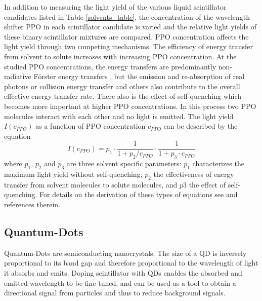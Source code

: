 \documentclass{JINST}
\begin{document}
 
In addition to measuring the light yield of the various liquid scintillator candidates listed in Table \ref{solvents_table}, the concentration of the wavelength shifter PPO in each scintillator candidate is varied and the relative light yields of these binary scintillator mixtures are compared. PPO concentration affects the light yield through two competing mechanisms. The efficiency of energy transfer from solvent to solute increases with increasing PPO concentration. At the studied PPO concentrations, the energy transfers are predominantly non-radiative F\"orster energy transfers \cite{foerster48,foerster59}, but the emission and re-absorption of real photons or collision energy transfer and others \cite{dexter53} also contribute to the overall effective energy transfer rate. There also is the effect of self-quenching \cite{birks64} which becomes more important at higher PPO concentrations. In this process two PPO molecules interact with each other and no light is emitted. 
The light yield $I(c_{PPO})$ as a function of PPO concentration $c_{PPO}$ can be described by the equation 
\begin{equation}
\label{fit_eq}
I(c_{PPO})=p_1 \cdot \frac{1}{1+p_2/c_{PPO}} \cdot \frac{1}{1+p_3\cdot c_{PPO}}
\end{equation} 
where $p_1$, $p_2$ and $p_3$ are three solvent specific parameters: $p_1$ characterizes the maximum light yield without self-quenching, $p_2$ the effectiveness of energy transfer from solvent molecules to solute molecules, and $p3$ the effect of self-quenching. For details on the derivation of these types of equations see \cite{buck07,aberle11} and references therein. 

\subsection{Quantum-Dots}\label{qd_sec}
Quantum-Dots are semiconducting nanocrystals. The size of a QD is inversely proportional to its band gap and therefore proportional to the wavelength of light it absorbs and emits. Doping scintillator with QDs enables the absorbed and emitted wavelength to be fine tuned, and can be used as a tool to obtain a directional signal from particles and thus to reduce background signals.
\end{document}
